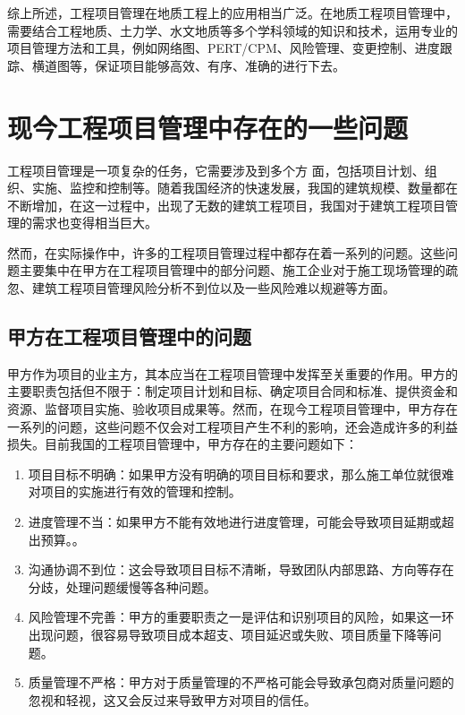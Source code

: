 	综上所述，工程项目管理在地质工程上的应用相当广泛。在地质工程项目管理中，需要结合工程地质、土力学、水文地质等多个学科领域的知识和技术，运用专业的项目管理方法和工具，例如网络图、PERT/CPM、风险管理、变更控制、进度跟踪、横道图等，保证项目能够高效、有序、准确的进行下去。
	
	\section{现今工程项目管理中存在的一些问题}
	
	工程项目管理是一项复杂的任务，它需要涉及到多个方 面，包括项目计划、组织、实施、监控和控制等。随着我国经济的快速发展，我国的建筑规模、数量都在不断增加，在这一过程中，出现了无数的建筑工程项目，我国对于建筑工程项目管理的需求也变得相当巨大。
	
	然而，在实际操作中，许多的工程项目管理过程中都存在着一系列的问题。这些问题主要集中在甲方在工程项目管理中的部分问题、施工企业对于施工现场管理的疏忽、建筑工程项目管理风险分析不到位以及一些风险难以规避等方面。
	
	\subsection{甲方在工程项目管理中的问题~\cite{ChenJinJiaFangZaiGongChengXiangMuGuanLiZhongDeWenTiFenXiJiDuiCe2023}~}
	
	甲方作为项目的业主方，其本应当在工程项目管理中发挥至关重要的作用。甲方的主要职责包括但不限于：制定项目计划和目标、确定项目合同和标准、提供资金和资源、监督项目实施、验收项目成果等。然而，在现今工程项目管理中，甲方存在一系列的问题，这些问题不仅会对工程项目产生不利的影响，还会造成许多的利益损失。目前我国的工程项目管理中，甲方存在的主要问题如下：
	
	\begin{enumerate}
		\item 项目目标不明确：如果甲方没有明确的项目目标和要求，那么施工单位就很难对项目的实施进行有效的管理和控制。
		\item 进度管理不当：如果甲方不能有效地进行进度管理，可能会导致项目延期或超出预算。。
		\item 沟通协调不到位：这会导致项目目标不清晰，导致团队内部思路、方向等存在分歧，处理问题缓慢等各种问题。
		\item 风险管理不完善：甲方的重要职责之一是评估和识别项目的风险，如果这一环出现问题，很容易导致项目成本超支、项目延迟或失败、项目质量下降等问题。\label{项目风险管理}
		\item 质量管理不严格：甲方对于质量管理的不严格可能会导致承包商对质量问题的忽视和轻视，这又会反过来导致甲方对项目的信任。
	\end{enumerate}
	

